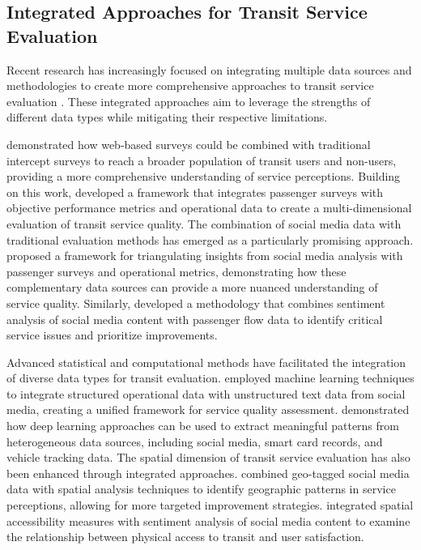 \documentclass[a4paper,fleqn,12pt]{cas-sc}
\begin{document}
\subsection{Integrated Approaches for Transit Service Evaluation}
Recent research has increasingly focused on integrating multiple data sources and methodologies to create more comprehensive approaches to transit service evaluation \citep{tse2018social, ma2018integrated}. These integrated approaches aim to leverage the strengths of different data types while mitigating their respective limitations.

\cite{zhao2013web} demonstrated how web-based surveys could be combined with traditional intercept surveys to reach a broader population of transit users and non-users, providing a more comprehensive understanding of service perceptions. Building on this work, \cite{barbosa2017combining} developed a framework that integrates passenger surveys with objective performance metrics and operational data to create a multi-dimensional evaluation of transit service quality. The combination of social media data with traditional evaluation methods has emerged as a particularly promising approach. \cite{collins2013social} proposed a framework for triangulating insights from social media analysis with passenger surveys and operational metrics, demonstrating how these complementary data sources can provide a more nuanced understanding of service quality. Similarly, \cite{wu2020integrated} developed a methodology that combines sentiment analysis of social media content with passenger flow data to identify critical service issues and prioritize improvements.

Advanced statistical and computational methods have facilitated the integration of diverse data types for transit evaluation. \cite{zhang2018analytics} employed machine learning techniques to integrate structured operational data with unstructured text data from social media, creating a unified framework for service quality assessment. \cite{jin2020deep} demonstrated how deep learning approaches can be used to extract meaningful patterns from heterogeneous data sources, including social media, smart card records, and vehicle tracking data. The spatial dimension of transit service evaluation has also been enhanced through integrated approaches. \cite{gal2014traveling} combined geo-tagged social media data with spatial analysis techniques to identify geographic patterns in service perceptions, allowing for more targeted improvement strategies. \cite{wang2020analyzing} integrated spatial accessibility measures with sentiment analysis of social media content to examine the relationship between physical access to transit and user satisfaction.
\end{document}
